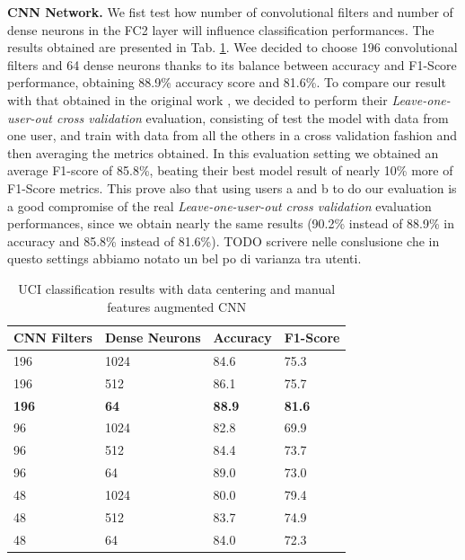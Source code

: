 \textbf{CNN Network.} We fist test how number of convolutional filters and number of dense neurons in the FC2 layer will influence classification performances. The results obtained are presented in Tab. \ref{tab:model-selection}. Wee decided to choose 196 convolutional filters and 64 dense neurons thanks to its balance between accuracy and F1-Score performance, obtaining 88.9\% accuracy score and  81.6\%. To compare our result with that obtained in the original work \cite{blunck2013heterogeneity}, we decided to perform their \textit{Leave-one-user-out cross validation} evaluation, consisting of test the model with data from one user, and train with data from all the others in a cross validation fashion and then averaging the metrics obtained. In this evaluation setting we obtained an average F1-score of 85.8\%, beating their best model result of nearly 10\% more of F1-Score metrics. This prove also that using users a and b to do our evaluation is a good compromise of the real \textit{Leave-one-user-out cross validation} evaluation performances, since we obtain nearly the same results (90.2\% instead of 88.9\% in accuracy and 85.8\% instead of 81.6\%). TODO scrivere nelle conslusione che in questo settings abbiamo notato un bel po di varianza tra utenti.

\begin{table}[h]
	\begin{center}
		\begin{tabular}{ p{1.8cm}p{1.7cm}p{1.7cm}p{1.7cm} }
			\hline
			CNN Filters & Dense Neurons & Accuracy & F1-Score \\
			\hline
			196 & 1024 & 84.6 & 75.3 \\
			196 & 512 & 86.1 & 75.7 \\
			\textbf{196} & \textbf{64} & \textbf{88.9} & \textbf{81.6} \\
			96 & 1024 & 82.8 & 69.9 \\
			96 & 512 & 84.4 & 73.7 \\
			96 & 64 & 89.0 & 73.0 \\
			48 & 1024 & 80.0 & 79.4 \\
			48 & 512 & 83.7 & 74.9 \\
			48 & 64 & 84.0 & 72.3 \\
			\hline
		\end{tabular}
		\caption{\label{tab:model-selection} UCI classification results with data centering and manual features augmented CNN}
	\end{center}
\end{table}


